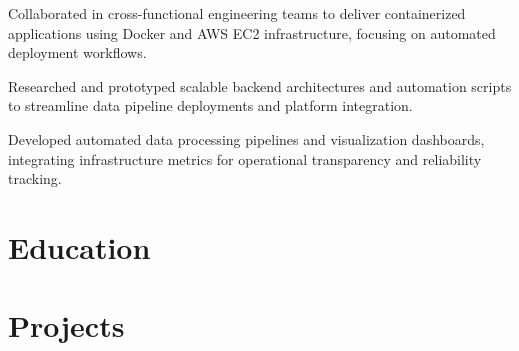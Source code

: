 \documentclass[11pt,a4paper]{resume}
\begin{document}
\bulletsend
\vspace{3pt}
\bullets
  \item Collaborated in cross-functional engineering teams to deliver containerized applications using Docker and AWS EC2 infrastructure, focusing on automated deployment workflows.
  \item Researched and prototyped scalable backend architectures and automation scripts to streamline data pipeline deployments and platform integration.
  \item Developed automated data processing pipelines and visualization dashboards, integrating infrastructure metrics for operational transparency and reliability tracking.
\bulletsend
\vspace{3pt}

\section{Education}

\vspace{2pt}

\section{Projects}
\end{document}
